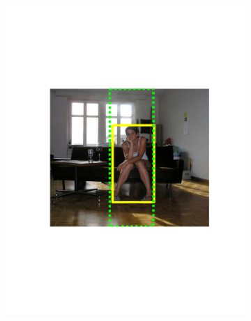 \begin{figure}[hbt]
    \centering
    \begin{subfigure}[b]{0.45\textwidth}
        \centering
        \includegraphics[width=\textwidth]{TP31116}
        \caption{}
        \label{fig:dettn1}
    \end{subfigure}
    ~
    \begin{subfigure}[b]{0.45\textwidth}
        \centering

\end{subfigure}
\end{figure}
